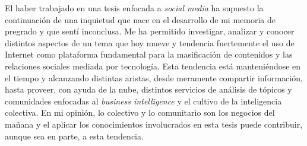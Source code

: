 El haber trabajado en una tesis enfocada a \textit{social media} ha supuesto la continuación de una inquietud que nace en el desarrollo de mi memoria de pregrado y que sentí inconclusa. Me ha permitido investigar, analizar y conocer distintos aspectos de un tema que hoy mueve y tendencia fuertemente el uso de Internet como plataforma fundamental para la masificación de contenidos y las relaciones sociales mediada por tecnología. Esta tendencia está manteniéndose en el tiempo y alcanzando distintas aristas, desde meramente compartir información, hasta proveer, con ayuda de la nube, distintos servicios de análisis de tópicos y comunidades enfocadas al \textit{business intelligence} y el cultivo de la inteligencia colectiva. En mi opinión, lo colectivo y lo comunitario son los negocios del mañana y el aplicar los conocimientos involucrados en esta tesis puede contribuir, aunque sea en parte, a esta tendencia.
